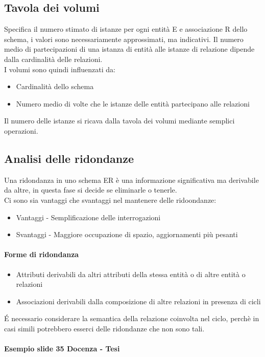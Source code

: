 \subsection{Tavola dei volumi}
Specifica il numero stimato di istanze per ogni entità E e associazione R dello schema, i valori sono 
necessariamente approssimati, ma indicativi. Il numero medio di partecipazioni di una istanza di entità
alle istanze di relazione dipende dalla cardinalità delle relazioni.\\
I volumi sono quindi influenzati da:
\begin{itemize}
    \item Cardinalità dello schema
    \item Numero medio di volte che le istanze delle entità partecipano alle relazioni
\end{itemize}
Il numero delle istanze si ricava dalla tavola dei volumi mediante semplici operazioni.
\subsection{Analisi delle ridondanze}
Una ridondanza in uno schema ER è una informazione significativa ma derivabile da altre, in
questa fase si decide se eliminarle o tenerle.\\
Ci sono sia vantaggi che svantaggi nel mantenere delle ridoondanze:
\begin{itemize}
    \item Vantaggi - Semplificazione delle interrogazioni
    \item Svantaggi - Maggiore occupazione di spazio, aggiornamenti più pesanti
\end{itemize}
\paragraph*{Forme di ridondanza}
\begin{itemize}
    \item Attributi derivabili da altri attributi della stessa entità o di altre entità o relazioni
    \item Associazioni derivabili dalla composizione di altre relazioni in presenza di cicli
\end{itemize}
\'E necessario considerare la semantica della relazione coinvolta nel ciclo, perchè in casi simili potrebbero
esserci delle ridondanze che non sono tali.
\paragraph*{Esempio slide 35 Docenza - Tesi}
